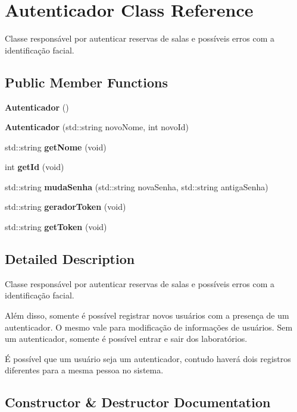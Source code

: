 \section{Autenticador Class Reference}
\label{class_autenticador}


Classe responsável por autenticar reservas de salas e possíveis erros com a identificação facial.  


\subsection*{Public Member Functions}
\begin{DoxyCompactItemize}
\item 
\textbf{ Autenticador} ()
\item 
\textbf{ Autenticador} (std\+::string novo\+Nome, int novo\+Id)
\item 
std\+::string \textbf{ get\+Nome} (void)
\item 
int \textbf{ get\+Id} (void)
\item 
std\+::string \textbf{ muda\+Senha} (std\+::string nova\+Senha, std\+::string antiga\+Senha)
\item 
std\+::string \textbf{ gerador\+Token} (void)
\item 
std\+::string \textbf{ get\+Token} (void)
\end{DoxyCompactItemize}


\subsection{Detailed Description}
Classe responsável por autenticar reservas de salas e possíveis erros com a identificação facial. 

Além disso, somente é possível registrar novos usuários com a presença de um autenticador. O mesmo vale para modificação de informações de usuários. Sem um autenticador, somente é possível entrar e sair dos laboratórios.

É possível que um usuário seja um autenticador, contudo haverá dois registros diferentes para a mesma pessoa no sistema. 

\subsection{Constructor \& Destructor Documentation}
\mbox{\label{class_autenticador_a3596badc05fd474dc357432162e9222e}} 
